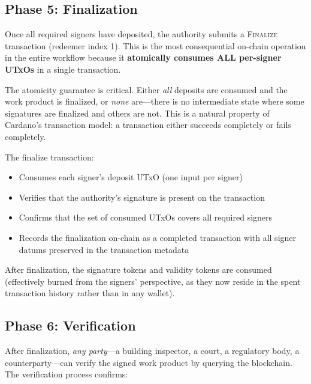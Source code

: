 \subsection{Phase 5: Finalization}

Once all required signers have deposited, the authority submits a
\textsc{Finalize} transaction (redeemer index 1).  This is the most
consequential on-chain operation in the entire workflow because it
\textbf{atomically consumes ALL per-signer UTxOs} in a single transaction.

The atomicity guarantee is critical.  Either \emph{all} deposits are
consumed and the work product is finalized, or \emph{none} are---there is
no intermediate state where some signatures are finalized and others are
not.  This is a natural property of Cardano's transaction model: a
transaction either succeeds completely or fails completely.

The finalize transaction:
\begin{itemize}[nosep]
  \item Consumes each signer's deposit UTxO (one input per signer)
  \item Verifies that the authority's signature is present on the transaction
  \item Confirms that the set of consumed UTxOs covers all required signers
  \item Records the finalization on-chain as a completed transaction with
    all signer datums preserved in the transaction metadata
\end{itemize}

After finalization, the signature tokens and validity tokens are consumed
(effectively burned from the signers' perspective, as they now reside in
the spent transaction history rather than in any wallet).

\subsection{Phase 6: Verification}

After finalization, \emph{any party}---a building inspector, a court, a
regulatory body, a counterparty---can verify the signed work product by
querying the blockchain.  The verification process confirms:

